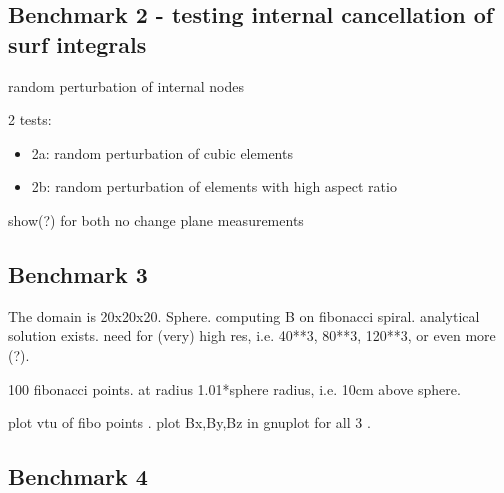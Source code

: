 \newpage
\subsection*{Benchmark 2 - testing internal cancellation of surf integrals} 

random perturbation of internal nodes


2 tests:
\begin{itemize}
\item 2a: random perturbation of cubic elements 
\item 2b: random perturbation of elements with high aspect ratio
\end{itemize}
show(?) for both no change plane measurements




\newpage
\subsection*{Benchmark 3}

The domain is 20x20x20. 
Sphere. computing B on fibonacci spiral. 
analytical solution exists.
need for (very) high res, i.e. 40**3, 80**3, 120**3, or even more (?).

100 fibonacci points. at radius 1.01*sphere radius, i.e. 10cm above sphere.

plot vtu of fibo points .
plot Bx,By,Bz in gnuplot for all 3 .



\newpage
\subsection*{Benchmark 4}





